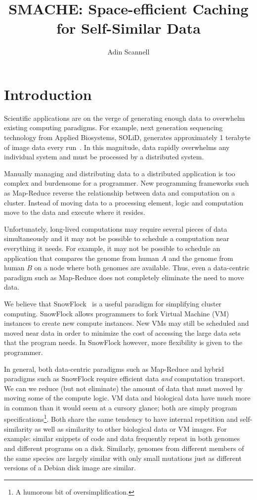 \documentclass{article}[12pt]
\begin{document}
\thispagestyle{empty}
\pagestyle{plain}

\author{Adin Scannell}
\title{SMACHE: Space-efficient Caching for Self-Similar Data}
\maketitle

\section*{Introduction}

Scientific applications are on the verge of generating enough data to overwhelm
existing computing paradigms.  For example, next generation sequencing
technology from Applied Biosystems, SOLiD, generates approximately 1 terabyte
of image data every run~\cite{ab}.  In this magnitude, data rapidly overwhelms
any individual system and must be processed by a distributed system.

Manually managing and distributing data to a distributed application is too
complex and burdensome for a programmer.  New programming frameworks such as
Map-Reduce reverse the relationship between data and computation on a cluster.
Instead of moving data to a processing element, logic and computation move to
the data and execute where it resides.

Unfortunately, long-lived computations may require several pieces of data
simultaneously and it may not be possible to schedule a computation near
everything it needs.  For example, it may not be possible to schedule an
application that compares the genome from human $A$ and the genome from human
$B$ on a node where both genomes are available.  Thus, even a data-centric
paradigm such as Map-Reduce does not completely eliminate the need to move
data.

We believe that SnowFlock~\cite{snowflock} is a useful paradigm for simplifying
cluster computing.  SnowFlock allows programmers to fork Virtual Machine (VM)
instances to create new compute instances.  New VMs may still be scheduled and
moved near data in order to minimize the cost of accessing the large data sets
that the program needs.  In SnowFlock however, more flexibility is given to the
programmer.

In general, both data-centric paradigms such as Map-Reduce and hybrid paradigms
such as SnowFlock require efficient data {\em and} computation transport.  We
can we reduce (but not eliminate) the amount of data that must moved by moving
some of the compute logic.  VM data and biological data have much more in
common than it would seem at a cursory glance; both are simply program
specifications\footnote{A humorous bit of oversimplification.}.  Both share
the same tendency to have internal repetition and self-similarity as well as
similarity to other biological data or VM images.  For example: similar snippets
of code and data frequently repeat in both genomes~\cite{biosequence} and
different programs on a disk.  Similarly, genomes from different members of the
same species are largely similar with only small mutations just as different
versions of a Debian disk image are similar.
\end{document}
